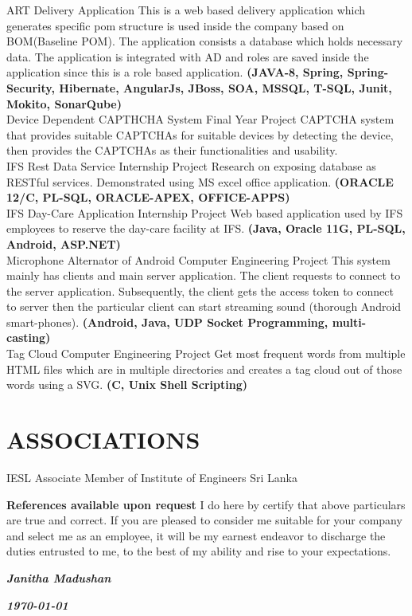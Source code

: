 \documentclass[]{cv-class}
\begin{document}
\begin{entrylist}
\entry
    {}
	{ART}    
    {Delivery Application}
{This is a web based delivery application which generates specific pom structure is used inside the company based on BOM(Baseline POM). The application consists a database which holds necessary data. The application is integrated with AD and roles are saved inside the application since this is a role based application. \textbf{(JAVA-8, Spring, Spring-Security, Hibernate, AngularJs, JBoss, SOA, MSSQL, T-SQL, Junit, Mokito, SonarQube)}}
\\
	\entry
    {}
    {Device Dependent CAPTHCHA System}
    {Final Year Project}
    {CAPTCHA system that provides suitable CAPTCHAs for suitable devices by  detecting  the  device, then provides the CAPTCHAs as their functionalities and usability.}	
	\\
  	\entry
    {}
    {IFS Rest Data Service}
    {Internship Project}
    {Research on exposing database as  RESTful  services. Demonstrated  using  MS  excel  office  application. \textbf{(ORACLE 12/C, PL-SQL, ORACLE-APEX, OFFICE-APPS)}}
	\\
  	\entry
    {}
    {IFS Day-Care Application}
    {Internship Project}
    {Web  based  application  used  by  IFS  employees  to  reserve  the  day-care facility at IFS. \textbf{(Java, Oracle 11G, PL-SQL, Android, ASP.NET)}}
	\\
	\entry
    {}
    {Microphone Alternator of Android}
    {Computer Engineering Project}
    {This system mainly has clients and main server application. The client requests to connect to the server application. Subsequently, the client gets the access token to connect to server then the particular client can start streaming sound (thorough Android smart-phones). \textbf{(Android, Java, UDP Socket Programming, multi-casting)}}
    \\ 
  	\entry
    {}
    {Tag Cloud}
    {Computer Engineering Project}
    {Get most frequent words from multiple HTML files which are in multiple directories and creates a tag cloud out of those words using a SVG. \textbf{(C, Unix Shell Scripting)}}
\end{entrylist}

\section{ASSOCIATIONS}
\begin{entrylist}
\entry
    {}
	{IESL}    
    {}
	{Associate Member of Institute of Engineers Sri Lanka}
\end{entrylist}
\begin{entrylist}
  \entry
    {}
    {}
    {}
    {\textbf{References available upon request}}
  \entry
    {}
    {}
    {}
    {I do here by certify that above particulars are true and correct. If you are pleased to consider me suitable for your company and select me as an employee, it will be my earnest endeavor to discharge the duties entrusted to me, to the best of my ability and rise to your expectations.}
\end{entrylist}

\begin{flushright}
\emph{\textbf{Janitha Madushan}}
\end{flushright}
\begin{flushright}
\emph{\textbf{\today}}
\end{flushright}
\end{document}
